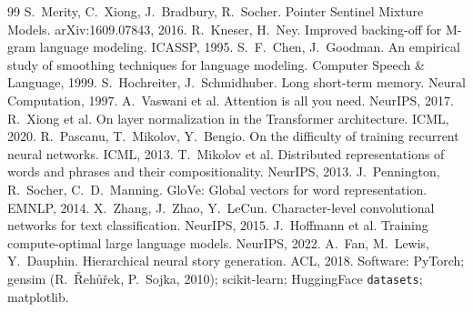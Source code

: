 \documentclass[10pt,a4paper]{article}
\begin{document}
{\small
\begin{thebibliography}{99}\setlength{\itemsep}{0pt}
 S.~Merity, C.~Xiong, J.~Bradbury, R.~Socher. Pointer Sentinel Mixture Models. arXiv:1609.07843, 2016.
 R.~Kneser, H.~Ney. Improved backing-off for M-gram language modeling. ICASSP, 1995.
 S.~F.~Chen, J.~Goodman. An empirical study of smoothing techniques for language modeling. Computer Speech \& Language, 1999.
 S.~Hochreiter, J.~Schmidhuber. Long short-term memory. Neural Computation, 1997.
 A.~Vaswani et al. Attention is all you need. NeurIPS, 2017.
 R.~Xiong et al. On layer normalization in the Transformer architecture. ICML, 2020.
 R.~Pascanu, T.~Mikolov, Y.~Bengio. On the difficulty of training recurrent neural networks. ICML, 2013.
 T.~Mikolov et al. Distributed representations of words and phrases and their compositionality. NeurIPS, 2013.
 J.~Pennington, R.~Socher, C.~D.~Manning. GloVe: Global vectors for word representation. EMNLP, 2014.
 X.~Zhang, J.~Zhao, Y.~LeCun. Character-level convolutional networks for text classification. NeurIPS, 2015.
 J.~Hoffmann et al. Training compute-optimal large language models. NeurIPS, 2022.
 A.~Fan, M.~Lewis, Y.~Dauphin. Hierarchical neural story generation. ACL, 2018.
 Software: PyTorch; gensim (R.~\v{R}eh\r{u}\v{r}ek, P.~Sojka, 2010); scikit-learn; HuggingFace \texttt{datasets}; matplotlib.
\end{thebibliography}
}

\clearpage
\appendix
\end{document}

